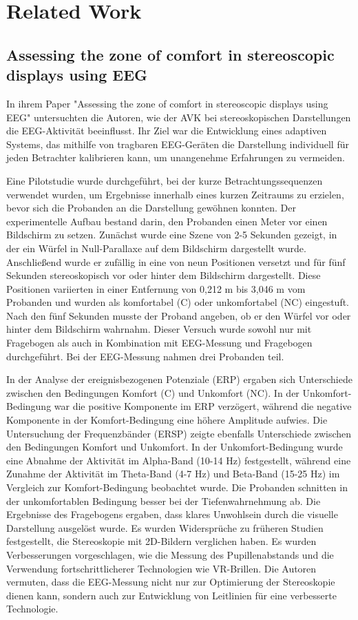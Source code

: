 \documentclass[conference]{IEEEtran}
\begin{document}
\section{Related Work}
\subsection{Assessing the zone of comfort in stereoscopic displays using EEG}
In ihrem Paper "\textnormal{Assessing} the zone of comfort in stereoscopic displays using EEG" \cite{b3} untersuchten die Autoren, wie der AVK bei stereoskopischen Darstellungen die EEG-Aktivität beeinflusst. Ihr Ziel war die Entwicklung eines adaptiven Systems, das mithilfe von tragbaren EEG-Geräten die Darstellung individuell für jeden Betrachter kalibrieren kann, um unangenehme Erfahrungen zu vermeiden.

Eine Pilotstudie wurde durchgeführt, bei der kurze Betrachtungssequenzen verwendet wurden, um Ergebnisse innerhalb eines kurzen Zeitraums zu erzielen, bevor sich die Probanden an die Darstellung gewöhnen konnten. Der experimentelle Aufbau bestand darin, den Probanden einen Meter vor einen Bildschirm zu setzen. Zunächst wurde eine Szene von 2-5 Sekunden gezeigt, in der ein Würfel in Null-Parallaxe auf dem Bildschirm dargestellt wurde. Anschließend wurde er zufällig in eine von neun Positionen versetzt und für fünf Sekunden stereoskopisch vor oder hinter dem Bildschirm dargestellt. Diese Positionen variierten in einer Entfernung von 0,212 m bis 3,046 m vom Probanden und wurden als komfortabel (C) oder unkomfortabel (NC) eingestuft. Nach den fünf Sekunden musste der Proband angeben, ob er den Würfel vor oder hinter dem Bildschirm wahrnahm. Dieser Versuch wurde sowohl nur mit Fragebogen als auch in Kombination mit EEG-Messung und Fragebogen durchgeführt. Bei der EEG-Messung nahmen drei Probanden teil.
 
In der Analyse der ereignisbezogenen Potenziale (ERP) ergaben sich Unterschiede zwischen den Bedingungen Komfort (C) und Unkomfort (NC). In der Unkomfort-Bedingung war die positive Komponente im ERP verzögert, während die negative Komponente in der Komfort-Bedingung eine höhere Amplitude aufwies. Die Untersuchung der Frequenzbänder (ERSP) zeigte ebenfalls Unterschiede zwischen den Bedingungen Komfort und Unkomfort. In der Unkomfort-Bedingung wurde eine Abnahme der Aktivität im Alpha-Band (10-14 Hz) festgestellt, während eine Zunahme der Aktivität im Theta-Band (4-7 Hz) und Beta-Band (15-25 Hz) im Vergleich zur Komfort-Bedingung beobachtet wurde. Die Probanden schnitten in der unkomfortablen Bedingung besser bei der Tiefenwahrnehmung ab. Die Ergebnisse des Fragebogens ergaben, dass klares Unwohlsein durch die visuelle Darstellung ausgelöst wurde. Es wurden Widersprüche zu früheren Studien festgestellt, die Stereoskopie mit 2D-Bildern verglichen haben. Es wurden Verbesserungen vorgeschlagen, wie die Messung des Pupillenabstands und die Verwendung fortschrittlicherer Technologien wie VR-Brillen. Die Autoren vermuten, dass die EEG-Messung nicht nur zur Optimierung der Stereoskopie dienen kann, sondern auch zur Entwicklung von Leitlinien für eine verbesserte Technologie.
\end{document}
